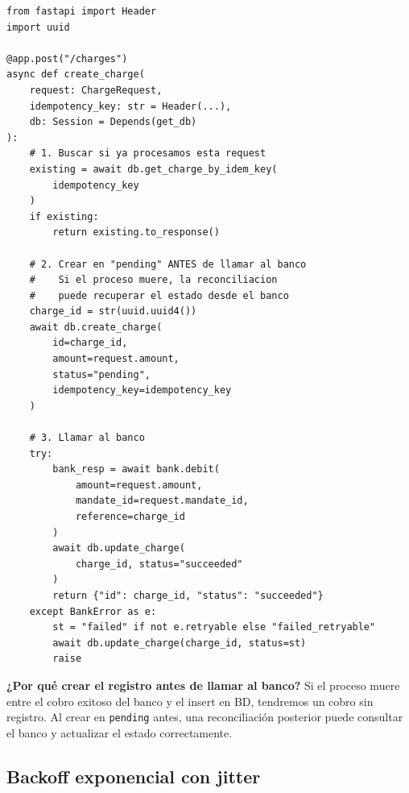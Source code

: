 \documentclass[11pt,a4paper]{article}
\begin{document}
\begin{pybox}
\begin{lstlisting}[style=python]
from fastapi import Header
import uuid

@app.post("/charges")
async def create_charge(
    request: ChargeRequest,
    idempotency_key: str = Header(...),
    db: Session = Depends(get_db)
):
    # 1. Buscar si ya procesamos esta request
    existing = await db.get_charge_by_idem_key(
        idempotency_key
    )
    if existing:
        return existing.to_response()

    # 2. Crear en "pending" ANTES de llamar al banco
    #    Si el proceso muere, la reconciliacion
    #    puede recuperar el estado desde el banco
    charge_id = str(uuid.uuid4())
    await db.create_charge(
        id=charge_id,
        amount=request.amount,
        status="pending",
        idempotency_key=idempotency_key
    )

    # 3. Llamar al banco
    try:
        bank_resp = await bank.debit(
            amount=request.amount,
            mandate_id=request.mandate_id,
            reference=charge_id
        )
        await db.update_charge(
            charge_id, status="succeeded"
        )
        return {"id": charge_id, "status": "succeeded"}
    except BankError as e:
        st = "failed" if not e.retryable else "failed_retryable"
        await db.update_charge(charge_id, status=st)
        raise
\end{lstlisting}
\end{pybox}

\begin{tipbox}
\textbf{¿Por qué crear el registro antes de llamar al banco?}
Si el proceso muere entre el cobro exitoso del banco y el insert en BD, tendremos
un cobro sin registro. Al crear en \texttt{pending} antes, una reconciliación
posterior puede consultar el banco y actualizar el estado correctamente.
\end{tipbox}

\subsection{Backoff exponencial con jitter}
\end{document}
